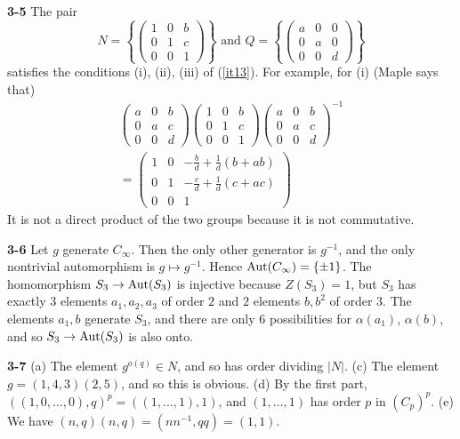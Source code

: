 \documentclass[a4paper,11pt,final]{memoir}%
\theoremstyle{nonumberplain}
\begin{document}
\bigskip\noindent\textbf{3-5}
The pair
\[
N=\left\{
\begin{pmatrix}
1 & 0 & b\\
0 & 1 & c\\
0 & 0 & 1
\end{pmatrix}
\right\}  \text{ and }Q=\left\{
\begin{pmatrix}
a & 0 & 0\\
0 & a & 0\\
0 & 0 & d
\end{pmatrix}
\right\}
\]
satisfies the conditions (i), (ii), (iii) of (\ref{it13}). For example, for
(i) (Maple says that)%
\begin{align*}%
\begin{pmatrix}
a & 0 & b\\
0 & a & c\\
0 & 0 & d
\end{pmatrix}%
\begin{pmatrix}
1 & 0 & b\\
0 & 1 & c\\
0 & 0 & 1
\end{pmatrix}%
\begin{pmatrix}
a & 0 & b\\
0 & a & c\\
0 & 0 & d
\end{pmatrix}
^{-1}\allowbreak\\
=\allowbreak%
\begin{pmatrix}
1 & 0 & -\frac{b}{d}+\frac{1}{d}\left(  b+ab\right) \\
0 & 1 & -\frac{c}{d}+\frac{1}{d}\left(  c+ac\right) \\
0 & 0 & 1
\end{pmatrix}
\end{align*}
It is not a direct product of the two groups because it is not commutative.

\bigskip\noindent\textbf{3-6}
Let $g$ generate $C_{\infty}$. Then the only other generator is $g^{-1}$, and
the only nontrivial automorphism is $g\mapsto g^{-1}$. Hence $\operatorname{Aut}(C_{\infty
})=\{\pm1\}$. The homomorphism $S_{3}\rightarrow\operatorname{Aut}(S_{3})$ is injective
because $Z(S_{3})=1$, but $S_{3}$ has exactly $3$ elements $a_{1},a_{2},a_{3}$
of order $2$ and $2$ elements $b,b^{2}$ of order $3$. The elements $a_{1},b$
generate $S_{3}$, and there are only $6$ possibilities for $\alpha(a_{1})$,
$\alpha(b)$, and so $S_{3}\rightarrow\operatorname{Aut}(S_{3})$ is also onto.

\bigskip\noindent\textbf{3-7}
(a) The element $g^{o(q)}\in N$, and so has order dividing $|N|$. (c) The
element $g=(1,4,3)(2,5)$, and so this is obvious. (d) By the first part,
$\left(  (1,0,\ldots,0),q\right)  ^{p}=((1,\ldots,1),1)$, and $(1,\ldots,1)$
has order $p$ in $(C_{p})^{p}$. (e) We have $(n,q)(n,q)=(nn^{-1},qq)=(1,1).$
\end{document}
